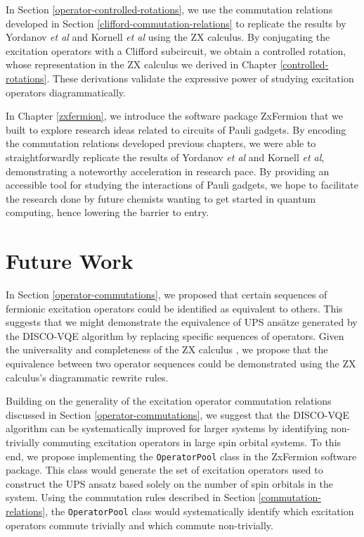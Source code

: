 In Section \ref{operator-controlled-rotations}, we use the commutation relations developed in Section \ref{clifford-commutation-relations} to replicate the results by Yordanov \textit{et al} and Kornell \textit{et al} using the ZX calculus. By conjugating the excitation operators with a Clifford subcircuit, we obtain a controlled rotation, whose representation in the ZX calculus we derived in Chapter \ref{controlled-rotations}. These derivations validate the expressive power of studying excitation operators diagrammatically.

In Chapter \ref{zxfermion}, we introduce the software package ZxFermion that we built to explore research ideas related to circuits of Pauli gadgets. By encoding the commutation relations developed previous chapters, we were able to straightforwardly replicate the results of Yordanov \textit{et al} and Kornell \textit{et al}, demonstrating a noteworthy acceleration in research pace. By providing an accessible tool for studying the interactions of Pauli gadgets, we hope to facilitate the research done by future chemists wanting to get started in quantum computing, hence lowering the barrier to entry.

\section{Future Work}

In Section \ref{operator-commutations}, we proposed that certain sequences of fermionic excitation operators could be identified as equivalent to others. This suggests that we might demonstrate the equivalence of UPS ansätze generated by the DISCO-VQE algorithm by replacing specific sequences of operators. Given the universality and completeness of the ZX calculus \cite{Coecke2011}, we propose that the equivalence between two operator sequences could be demonstrated using the ZX calculus's diagrammatic rewrite rules.

Building on the generality of the excitation operator commutation relations discussed in Section \ref{operator-commutations}, we suggest that the DISCO-VQE algorithm can be systematically improved for larger systems by identifying non-trivially commuting excitation operators in large spin orbital systems. To this end, we propose implementing the \lstinline{OperatorPool} class in the ZxFermion software package. This class would generate the set of excitation operators used to construct the UPS ansatz based solely on the number of spin orbitals in the system. Using the commutation rules described in Section \ref{commutation-relations}, the \lstinline{OperatorPool} class would systematically identify which excitation operators commute trivially and which commute non-trivially.

